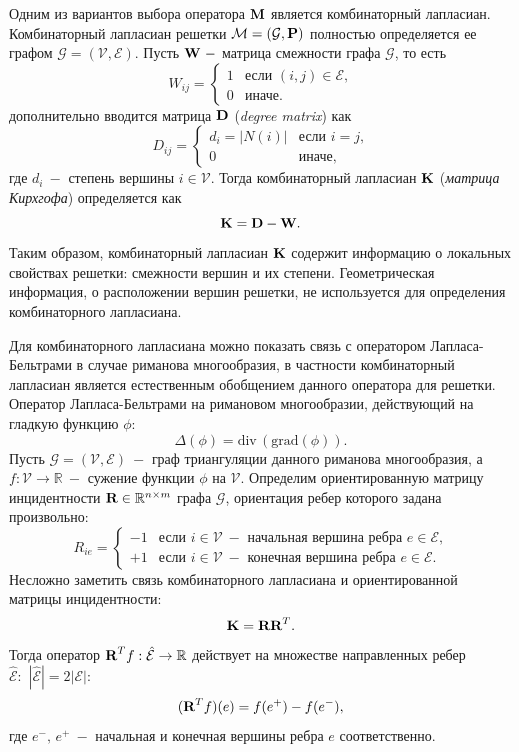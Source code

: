 Одним из вариантов выбора оператора $\textbf{M}$ является комбинаторный лапласиан.
Комбинаторный лапласиан решетки $\mathcal{M} = (\mathcal{G}, \textbf{P})$ полностью определяется ее графом $\mathcal{G} = (\mathcal{V}, \mathcal{E})$. Пусть $\textbf{W} ~-$ матрица смежности графа $\mathcal{G}$, то есть 
		\begin{equation*}
		W_{ij} = 
		 \begin{cases}
   		1 &\text{если $(i,j) \in \mathcal{E}$,}\\
   		0 &\text{иначе.}
		 \end{cases}
		\end{equation*}
дополнительно вводится матрица $\textbf{D}$ (\textit{degree matrix}) как 
		\begin{equation*}
		D_{ij} = 
		 \begin{cases}
   		d_i = |N(i)|&\text{если $i=j$,}\\
   		0 &\text{иначе,}
		 \end{cases}
		\end{equation*}
где $d_i ~-$ степень вершины $i \in \mathcal{V}$. Тогда комбинаторный лапласиан $\textbf{K}$ (\textit{матрица Кирхгофа}) определяется как
		\begin{equation*}
		\textbf{K} = \textbf{D} -\textbf{W}.
		\end{equation*}
Таким образом, комбинаторный лапласиан $\textbf{K}$ содержит информацию о локальных свойствах решетки: смежности вершин и их степени. Геометрическая информация, о расположении вершин решетки, не используется для определения комбинаторного лапласиана.

Для комбинаторного лапласиана можно показать связь с оператором Лапласа-Бельтрами в случае риманова многообразия, в частности комбинаторный лапласиан является естественным обобщением данного оператора для решетки.
Оператор Лапласа-Бельтрами на римановом многообразии, действующий на гладкую функцию $\phi$: 
	$$\Delta(\phi) = \text{div}\, (\text{grad}(\phi)).$$
Пусть $\mathcal{G} = (\mathcal{V}, \mathcal{E}) ~-$ граф триангуляции данного риманова многообразия, а $f : \mathcal{V} \to \mathbb{R} ~- $ сужение функции $\phi$ на $\mathcal{V}$.
Определим ориентированную матрицу инцидентности $\textbf{R} \in \mathbb{R}^{n \times m}$ графа $\mathcal{G}$, ориентация ребер которого задана произвольно:
	\begin{equation*}
		R_{ie} = 
		 \begin{cases}
   		-1 &\text{если $i \in \mathcal{V} ~-$ начальная вершина ребра $e \in \mathcal{E}$,}\\
   		+1 &\text{если $i \in \mathcal{V} ~-$ конечная вершина ребра $e \in \mathcal{E}$.}
		 \end{cases}
	\end{equation*}
Несложно заметить связь комбинаторного лапласиана и ориентированной матрицы инцидентности: $$\textbf{K} = \textbf{R} \textbf{R}^T.$$
Тогда оператор $\textbf{R}^T f : \hat{\mathcal{E}} \to \mathbb{R} $ действует на множестве направленных ребер $\hat{\mathcal{E}}: \,\, | \hat{\mathcal{E}}| = 2 |\mathcal{E}|$:
	$$(\textbf{R}^T f)(e) = f(e^+) - f(e^-),$$
где $e^-, \, e^+ ~-$ начальная и конечная вершины ребра $e$ соответственно. 
	
